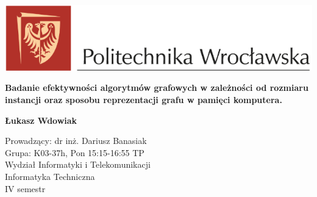 \begin{titlepage}
    \begin{center}


        \vspace*{-3cm}

        \includegraphics[width=14cm]{images/image.png}

        \vspace*{2cm}
        \huge
        \textbf{Badanie efektywności algorytmów grafowych w zależności od rozmiaru instancji oraz sposobu
            reprezentacji grafu w pamięci komputera.}

        \vspace{0.5cm}


        \vspace{1.5cm}

        \textbf{Łukasz Wdowiak}

        \vspace{2cm}

        \vfill
        Prowadzący: dr inż. Dariusz Banasiak \\
        Grupa: K03-37h, Pon 15:15-16:55 TP \\
        \vspace{2cm}
        Wydział Informatyki i Telekomunikacji \\
        Informatyka Techniczna \\
        IV semestr\\




    \end{center}
\end{titlepage}